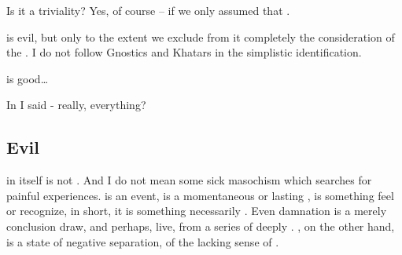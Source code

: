 {\pa
{} Is 
it a triviality? Yes, of course --  if we only assumed that .

\pa
{} is evil, but only to the extent we exclude from it 
completely the consideration of the . I do not follow 
Gnostics and Khatars in the simplistic identification.

 is good\ldots

In  I said  - really, 
everything?

\subsection{Evil}

\pa {} in itself is not .  And I do not mean
some sick masochism which searches for painful experiences.  
is an event, is a momentaneous or lasting , is
something  feel or recognize, in short, it is something
necessarily .  Even damnation is a merely 
conclusion  draw, and perhaps, live, from a series of deeply 
 .  , on the other hand, is
a state of negative separation, of the lacking sense of
.


}
